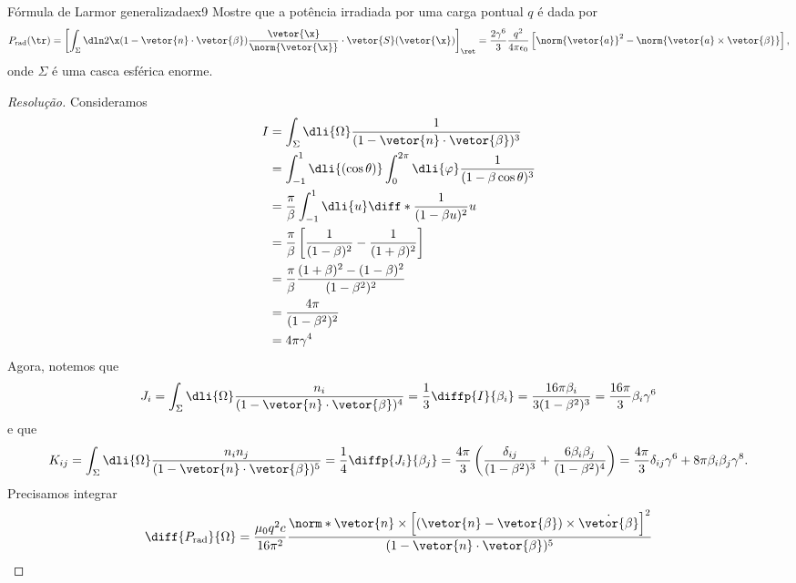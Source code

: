 \begin{exercício}{Fórmula de Larmor generalizada}{ex9}
    Mostre que a potência irradiada por uma carga pontual \(q\) é dada por
    \begin{equation*}
        P_\mathrm{rad}(\tr) = \left[\int_{\Sigma} \dln2\x (1 - \vetor{n} \cdot \vetor{\beta})\frac{\vetor{\x}}{\norm{\vetor{\x}}}\cdot \vetor{S}(\vetor{\x})\right]_\ret = \frac{2 \gamma^6}{3} \frac{q^2}{4\pi \epsilon_0} \left[\norm{\vetor{a}}^2 - \norm{\vetor{a} \times \vetor{\beta}}\right],
    \end{equation*}
    onde \(\Sigma\) é uma casca esférica enorme.
\end{exercício}
\begin{proof}[Resolução]
    Consideramos
    \begin{align*}
        I &= \int_{\Sigma}\dli{\Omega}\frac1{(1 - \vetor{n} \cdot \vetor{\beta})^3}\\
          &= \int_{-1}^{1} \dli{(\cos\theta)} \int_0^{2\pi} \dli{\varphi} \frac{1}{(1 - \beta \cos\theta)^3}\\
          &= \frac{\pi}{\beta} \int_{-1}^1 \dli{u} \diff*{\frac{1}{(1 - \beta u)^2}}{u}\\
          &= \frac{\pi}{\beta} \left[\frac{1}{(1 - \beta)^2} - \frac{1}{(1 + \beta)^2}\right]\\
          &= \frac{\pi}{\beta} \frac{(1 + \beta)^2 - (1 - \beta)^2}{(1 - \beta^2)^2}\\
          &= \frac{4\pi}{(1 - \beta^2)^2}\\
          &= 4\pi \gamma^4
    \end{align*}
    Agora, notemos que
    \begin{equation*}
        J_i = \int_{\Sigma} \dli{\Omega} \frac{n_i}{(1 - \vetor{n} \cdot \vetor{\beta})^4} = \frac{1}{3} \diffp{I}{\beta_i} = \frac{16\pi \beta_i}{3(1 - \beta^2)^3} = \frac{16\pi}{3} \beta_i \gamma^6
    \end{equation*}
    e que
    \begin{equation*}
        K_{ij} = \int_{\Sigma} \dli{\Omega} \frac{n_i n_j}{(1 - \vetor{n} \cdot \vetor{\beta})^5} = \frac{1}{4} \diffp{J_i}{\beta_j} = \frac{4\pi}{3}\left(\frac{\delta_{ij}}{(1 - \beta^2)^3} + \frac{6 \beta_i \beta_j}{(1 - \beta^2)^4}\right) = \frac{4\pi}{3} \delta_{ij} \gamma^6 + 8\pi \beta_i \beta_j \gamma^8.
    \end{equation*}
    Precisamos integrar 
    \begin{equation*}
        \diff{P_\mathrm{rad}}{\Omega} = \frac{\mu_0 q^2 c}{16 \pi^2}  \frac{\norm*{\vetor{n} \times \left[(\vetor{n} - \vetor{\beta}) \times \dot{\vetor{\beta}}\right]}^2}{(1 - \vetor{n}\cdot \vetor{\beta})^5}

\end{equation*}
\end{proof}

